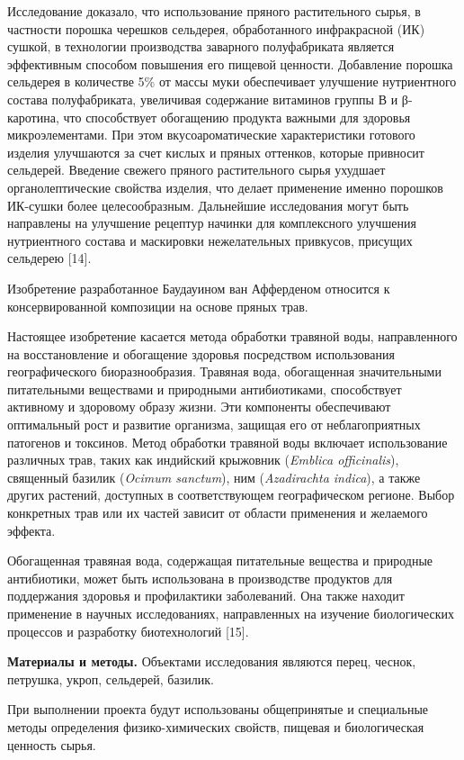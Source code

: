 \begin{multicols}{2}
Исследование доказало, что использование пряного растительного сырья, в
частности порошка черешков сельдерея, обработанного инфракрасной (ИК)
сушкой, в технологии производства заварного полуфабриката является
эффективным способом повышения его пищевой ценности. Добавление порошка
сельдерея в количестве 5\% от массы муки обеспечивает улучшение
нутриентного состава полуфабриката, увеличивая содержание витаминов
группы В и β-каротина, что способствует обогащению продукта важными для
здоровья микроэлементами. При этом вкусоароматические характеристики
готового изделия улучшаются за счет кислых и пряных оттенков, которые
привносит сельдерей. Введение свежего пряного растительного сырья
ухудшает органолептические свойства изделия, что делает применение
именно порошков ИК-сушки более целесообразным. Дальнейшие исследования
могут быть направлены на улучшение рецептур начинки для комплексного
улучшения нутриентного состава и маскировки нежелательных привкусов,
присущих сельдерею {[}14{]}.

Изобретение разработанное Баудауином ван Афферденом относится к
консервированной композиции на основе пряных трав.

Настоящее изобретение касается метода обработки травяной воды,
направленного на восстановление и обогащение здоровья посредством
использования географического биоразнообразия. Травяная вода,
обогащенная значительными питательными веществами и природными
антибиотиками, способствует активному и здоровому образу жизни. Эти
компоненты обеспечивают оптимальный рост и развитие организма, защищая
его от неблагоприятных патогенов и токсинов. Метод обработки травяной
воды включает использование различных трав, таких как индийский
крыжовник (\emph{Emblica officinalis}), священный базилик (\emph{Ocimum
sanctum}), ним (\emph{Azadirachta indica}), а также других растений,
доступных в соответствующем географическом регионе. Выбор конкретных
трав или их частей зависит от области применения и желаемого эффекта.

Обогащенная травяная вода, содержащая питательные вещества и природные
антибиотики, может быть использована в производстве продуктов для
поддержания здоровья и профилактики заболеваний. Она также находит
применение в научных исследованиях, направленных на изучение
биологических процессов и разработку биотехнологий {[}15{]}.

{\bfseries Материалы и методы.} Объектами исследования являются перец,
чеснок, петрушка, укроп, сельдерей, базилик.

При выполнении проекта будут использованы общепринятые и специальные
методы определения физико-химических свойств, пищевая и биологическая
ценность сырья.


\end{multicols}
